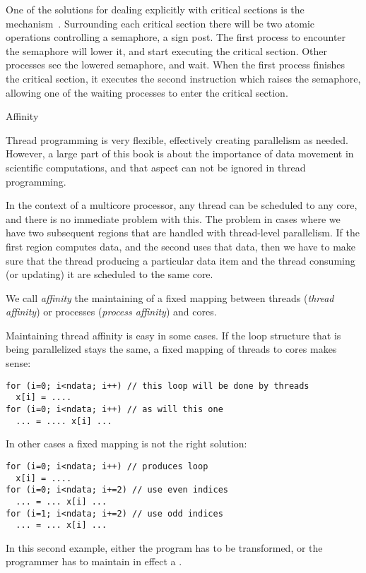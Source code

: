 One of the solutions for dealing explicitly with critical sections is the
mechanism~\cite{Dijkstra:semaphores}. Surrounding each critical
section there will be two atomic operations controlling a semaphore, a
sign post.
The first process to encounter the semaphore will lower it, and start
executing the critical section. Other processes see the lowered
semaphore, and wait. When the first process finishes the critical
section, it executes the second instruction which raises the
semaphore, allowing one of the waiting processes to enter the critical
section.


 {Affinity}

Thread programming is very flexible, effectively creating parallelism
as needed. However, a large part of this book is about the importance
of data movement in scientific computations, and that aspect can not
be ignored in thread programming.

In the context of a multicore processor, any thread can be scheduled
to any core, and there is no immediate problem with this. The problem
in cases where we have two subsequent regions that are handled with
thread-level parallelism. If the first region computes data, and the
second uses that data, then we have to make sure that the thread
producing a particular data item and the thread consuming (or
updating) it are scheduled to the same core.

We call \emph{affinity} the maintaining of a fixed mapping between
threads (\emph{thread affinity})
or processes (\emph{process
  affinity}) and cores.

Maintaining thread affinity is easy in some cases. If the loop
structure that is being parallelized stays the same, a fixed mapping
of threads to cores makes sense:
\begin{verbatim}
for (i=0; i<ndata; i++) // this loop will be done by threads
  x[i] = ....
for (i=0; i<ndata; i++) // as will this one
  ... = .... x[i] ...
\end{verbatim}
In other cases a fixed mapping is not the right solution:
\begin{verbatim}
for (i=0; i<ndata; i++) // produces loop
  x[i] = ....
for (i=0; i<ndata; i+=2) // use even indices
  ... = ... x[i] ...
for (i=1; i<ndata; i+=2) // use odd indices
  ... = ... x[i] ...
\end{verbatim}
In this second example, either the program has to be transformed, or
the programmer has to maintain in effect a .

